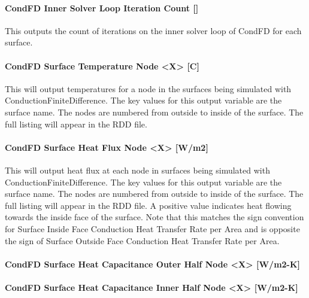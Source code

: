 \paragraph{CondFD Inner Solver Loop Iteration Count {[]}}\label{condfd-inner-solver-loop-iteration-count}

This outputs the count of iterations on the inner solver loop of CondFD for each surface.

\paragraph{CondFD Surface Temperature Node \textless{}X\textgreater{} {[}C{]}}\label{condfd-surface-temperature-node-x-c}

This will output temperatures for a node in the surfaces being simulated with ConductionFiniteDifference. The key values for this output variable are the surface name. The nodes are numbered from outside to inside of the surface. The full listing will appear in the RDD file.

\paragraph{CondFD Surface Heat Flux Node \textless{}X\textgreater{} {[}W/m2{]}}\label{condfd-surface-heat-flux-node-x-wm2}

This will output heat flux at each node in surfaces being simulated with ConductionFiniteDifference. The key values for this output variable are the surface name. The nodes are numbered from outside to inside of the surface. The full listing will appear in the RDD file. A positive value indicates heat flowing towards the inside face of the surface. Note that this matches the sign convention for Surface Inside Face Conduction Heat Transfer Rate per Area and is opposite the sign of Surface Outside Face Conduction Heat Transfer Rate per Area.

\paragraph{CondFD Surface Heat Capacitance Outer Half Node \textless{}X\textgreater{} {[}W/m2-K{]}}\label{condfd-surface-heat-capacitance-outer-half-node-x-wm2-k}

\paragraph{CondFD Surface Heat Capacitance Inner Half Node \textless{}X\textgreater{} {[}W/m2-K{]}}\label{condfd-surface-heat-capacitance-inner-half-node-x-wm2-k}

